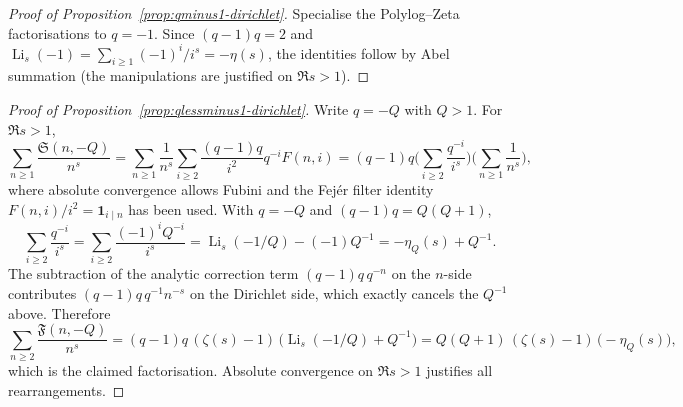 \documentclass[11pt,a4paper]{amsart}
\theoremstyle{plain}
\theoremstyle{definition}
\theoremstyle{remark}
\begin{document}
\begin{proof}[Proof of Proposition~\ref{prop:qminus1-dirichlet}]
Specialise the Polylog--Zeta factorisations to $q=-1$. Since $(q-1)q=2$ and $\operatorname{Li}_s(-1)=\sum_{i\ge1}(-1)^i/i^s=-\eta(s)$, the identities follow by Abel summation (the manipulations are justified on $\Re s>1$).
\end{proof}

\begin{proof}[Proof of Proposition~\ref{prop:qlessminus1-dirichlet}]
Write $q=-Q$ with $Q>1$. For $\Re s>1$,
\[
\sum_{n\ge1}\frac{\mathfrak S(n,-Q)}{n^s}
=\sum_{n\ge1}\frac{1}{n^s}\sum_{i\ge2}\frac{(q-1)q}{i^2}q^{-i}F(n,i)
=(q-1)q\Big(\sum_{i\ge2}\frac{q^{-i}}{i^s}\Big)\Big(\sum_{n\ge1}\frac{1}{n^s}\Big),
\]
where absolute convergence allows Fubini and the Fejér filter identity $F(n,i)/i^2=\mathbf 1_{i\mid n}$ has been used. With $q=-Q$ and $(q-1)q=Q(Q+1)$,
\[
\sum_{i\ge2}\frac{q^{-i}}{i^s}
=\sum_{i\ge2}\frac{(-1)^i Q^{-i}}{i^s}
=\operatorname{Li}_s(-1/Q)-(-1)Q^{-1}
=-\eta_Q(s)+Q^{-1}.
\]
The subtraction of the analytic correction term $(q-1)q\,q^{-n}$ on the $n$-side contributes $(q-1)q\,q^{-1}n^{-s}$ on the Dirichlet side, which exactly cancels the $Q^{-1}$ above. Therefore
\[
\sum_{n\ge2}\frac{\mathfrak F(n,-Q)}{n^s}
=(q-1)q\,(\zeta(s)-1)\,\bigl(\operatorname{Li}_s(-1/Q)+Q^{-1}\bigr)
=Q(Q+1)\,(\zeta(s)-1)\,\bigl(-\eta_Q(s)\bigr),
\]
which is the claimed factorisation. Absolute convergence on $\Re s>1$ justifies all rearrangements.
\end{proof}
\end{document}
